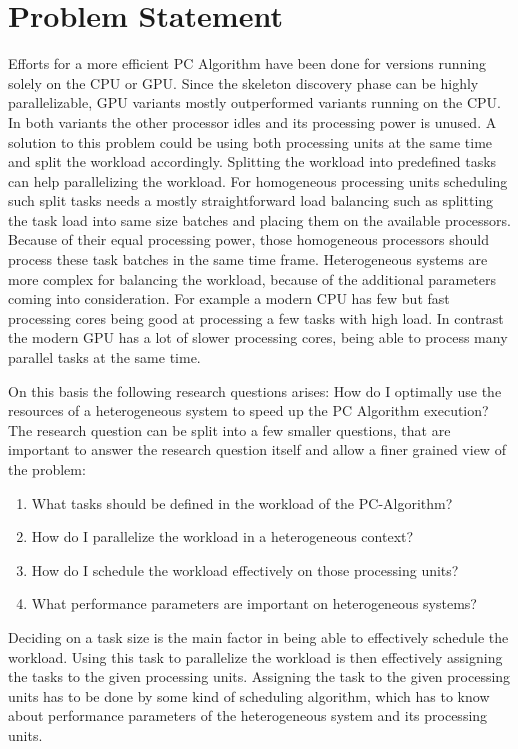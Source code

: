 \chapter{Problem Statement}
Efforts for a more efficient PC Algorithm have been done for versions running solely on the CPU or GPU. Since the skeleton discovery phase can be highly parallelizable, GPU variants mostly outperformed variants running on the CPU. In both variants the other processor idles and its processing power is unused. A solution to this problem could be using both processing units at the same time and split the workload accordingly.
Splitting the workload into predefined tasks can help parallelizing the workload. For homogeneous processing units scheduling such split tasks needs a mostly straightforward load balancing such as splitting the task load into same size batches and placing them on the available processors.
Because of their equal processing power, those homogeneous processors should process these task batches in the same time frame.
Heterogeneous systems are more complex for balancing the workload, because of the additional parameters coming into consideration. For example a modern CPU has few but fast processing cores being good at processing a few tasks with high load. In contrast the modern GPU has a lot of slower processing cores, being able to process many parallel tasks at the same time.

On this basis the following research questions arises: How do I optimally use the resources of a heterogeneous system to speed up the PC Algorithm execution?
The research question can be split into a few smaller questions, that are important to answer the research question itself and allow a finer grained view of the problem:

\begin{enumerate}
  \item What tasks should be defined in the workload of the PC-Algorithm?
  \item How do I parallelize the workload in a heterogeneous context?
  \item How do I schedule the workload effectively on those processing units?
  \item What performance parameters are important on heterogeneous systems?
\end{enumerate}

Deciding on a task size is the main factor in being able to effectively schedule the workload. Using this task to parallelize the workload is then effectively assigning the tasks to the given processing units. Assigning the task to the given processing units has to be done by some kind of scheduling algorithm, which has to know about performance parameters of the heterogeneous system and its processing units.
